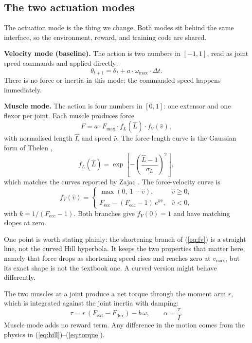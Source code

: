 \documentclass[conference]{IEEEtran}
\begin{document}
\subsection{The two actuation modes}
\label{sec:actuation}

The actuation mode is the thing we change. Both modes sit behind the same
interface, so the environment, reward, and training code are shared.

\textbf{Velocity mode (baseline).} The action is two numbers in $[-1,1]$, read
as joint speed commands and applied directly:
\begin{equation}
\theta_{t+1} = \theta_t + a \cdot \omega_{\max} \cdot \Delta t .
\label{eq:velocity}
\end{equation}
There is no force or inertia in this mode; the commanded speed happens
immediately.

\textbf{Muscle mode.} The action is four numbers in $[0,1]$: one extensor and
one flexor per joint. Each muscle produces force
\begin{equation}
F = a \cdot F_{\max} \cdot f_L(\hat{L}) \cdot f_V(\hat{v}),
\label{eq:hill}
\end{equation}
with normalised length $\hat{L}$ and speed $\hat{v}$. The force-length curve is
the Gaussian form of Thelen \cite{thelen2003},
\begin{equation}
f_L(\hat{L}) = \exp\!\left[-\left(\frac{\hat{L}-1}{\sigma_L}\right)^{\!2}\right],
\label{eq:fl}
\end{equation}
which matches the curves reported by Zajac \cite{zajac1989}. The
force-velocity curve is
\begin{equation}
f_V(\hat{v}) =
\begin{cases}
\max(0,\ 1 - \hat{v}), & \hat{v} \geq 0,\\[3pt]
F_{\mathrm{ecc}} - (F_{\mathrm{ecc}}-1)\,e^{k\hat{v}}, & \hat{v} < 0,
\end{cases}
\label{eq:fv}
\end{equation}
with $k = 1/(F_{\mathrm{ecc}}-1)$. Both branches give $f_V(0)=1$ and have
matching slopes at zero.

One point is worth stating plainly: the shortening branch of (\ref{eq:fv}) is a
straight line, not the curved Hill hyperbola. It keeps the two properties that
matter here, namely that force drops as shortening speed rises and reaches zero
at $v_{\max}$, but its exact shape is not the textbook one. A curved version
might behave differently.

The two muscles at a joint produce a net torque through the moment arm $r$,
which is integrated against the joint inertia with damping:
\begin{equation}
\tau = r\,(F_{\mathrm{ext}} - F_{\mathrm{flex}}) - b\,\omega, \qquad
\alpha = \frac{\tau}{I}.
\label{eq:torque}
\end{equation}
Muscle mode adds no reward term. Any difference in the motion comes from the
physics in (\ref{eq:hill})--(\ref{eq:torque}).
\end{document}
